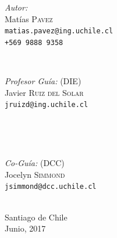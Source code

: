 \documentclass[12pt,letterpaper,spanish]{book}
\begin{document}
\begin{titlepage}
\begin{minipage}{0.4\textwidth}
\begin{flushleft} \large
\emph{Autor:}\\
Mat\'ias \textsc{Pavez}\\
\texttt{\normalsize matias.pavez@ing.uchile.cl} \\
\texttt{\normalsize +569 9888 9358}
\end{flushleft}
\end{minipage}
~
\begin{minipage}{0.4\textwidth}
\begin{flushright} \large
\emph{Profesor Gu\'ia:} (DIE) \\
Javier \textsc{Ruiz del Solar}\\
\texttt{\normalsize jruizd@ing.uchile.cl}
\end{flushright}
\end{minipage}\\[1cm]
\begin{minipage}{0.4\textwidth}
\begin{flushleft}\end{flushleft}
\end{minipage}
~
\begin{minipage}{0.4\textwidth}
\begin{flushright} \large
\emph{Co-Gu\'ia:} (DCC)\\
Jocelyn \textsc{Simmond}\\
\texttt{\normalsize jsimmond@dcc.uchile.cl}
\end{flushright}
\end{minipage}\\[2cm]
{\large Santiago de Chile}\\
{\large Junio, 2017}
\vfill
 
\end{titlepage}

\tableofcontents








\end{document}
